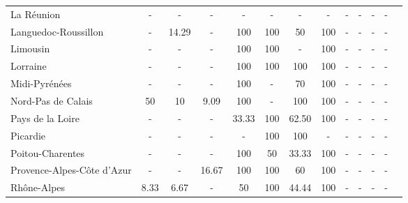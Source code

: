 \begin{table}[H]
\begin{tabularx}{\textwidth}{Xcccccccccccc}
            La Réunion  & - & - & - & - & - & - & - & - & - & - & - \\
            Languedoc-Roussillon & - & 14.29 & - & 100 & 100 & 50 & 100 & - & - & - & - \\
            Limousin & - & - & - & 100 & 100 & - & 100 & - & - & - & - \\
            Lorraine & - & - & - & 100 & 100 & 100 & 100 & - & - & - & - \\
            Midi-Pyrénées & - & - & - & 100 & - & 70 & 100 & - & - & - & - \\
            Nord-Pas de Calais & 50 & 10 & 9.09 & 100 & - & 100 & 100 & - & - & - & - \\
            Pays de la Loire & - & - & - & 33.33 & 100 & 62.50 & 100 & - & - & - & - \\
            Picardie & - & - & - & - & 100 & 100 & - & - & - & - & - \\
            Poitou-Charentes & - & - & - & 100 & 50 & 33.33 & 100 & - & - & - & - \\
            Provence-Alpes-Côte d’Azur & - & - & 16.67 & 100 & 100 & 60 & 100 & - & - & - & - \\
            Rhône-Alpes & 8.33 & 6.67 & - & 50 & 100 & 44.44 & 100 & - & - & - & - \\
        \bottomrule
    \end{tabularx}
\end{table}
    